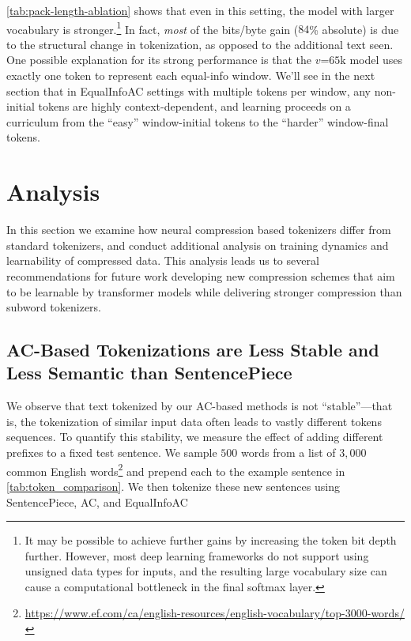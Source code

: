 \ref{tab:pack-length-ablation} shows that even in this setting, the model with larger vocabulary is stronger.\footnote{It may be possible to achieve further gains by increasing the token bit depth further. However, most deep learning frameworks do not support using unsigned data types for inputs, and the resulting large vocabulary size can cause a computational bottleneck in the final softmax layer.} In fact, \emph{most} of the bits/byte gain ($84$\% absolute) is due to the structural change in tokenization, as opposed to the additional text seen. One possible explanation for its strong performance is that the $v\mathord{=}65\text{k}$ model uses exactly one token to represent each equal-info window. We'll see in the next section that in EqualInfoAC settings with multiple tokens per window, any non-initial tokens are highly context-dependent, and learning proceeds on a curriculum from the ``easy'' window-initial tokens to the ``harder'' window-final tokens.

\section{Analysis}
\label{sec:analysis}

In this section we examine how neural compression based tokenizers differ from standard tokenizers, and conduct additional analysis on training dynamics and learnability of compressed data. This analysis leads us to several recommendations for future work developing new compression schemes that aim to be learnable by transformer models while delivering stronger compression than subword tokenizers.

\subsection{AC-Based Tokenizations are Less Stable and Less Semantic than SentencePiece}
\label{sec:segmentation}

We observe that text tokenized by our AC\ifthenelse{\equal{}}{}{$[v\mathord{=}\ifthenelse{\equal{}{8}}{256}{65\text{k}}]$}-based methods is not ``stable''---that is, the tokenization of similar input data often leads to vastly different tokens sequences. To quantify this stability, we measure the effect of adding different prefixes to a fixed test sentence. We sample $500$ words from a list of $3{,}000$ common English words\footnote{\url{https://www.ef.com/ca/english-resources/english-vocabulary/top-3000-words/}} and prepend each to the example sentence in \ref{tab:token_comparison}. We then tokenize these new sentences using SentencePiece, AC, and EqualInfoAC

